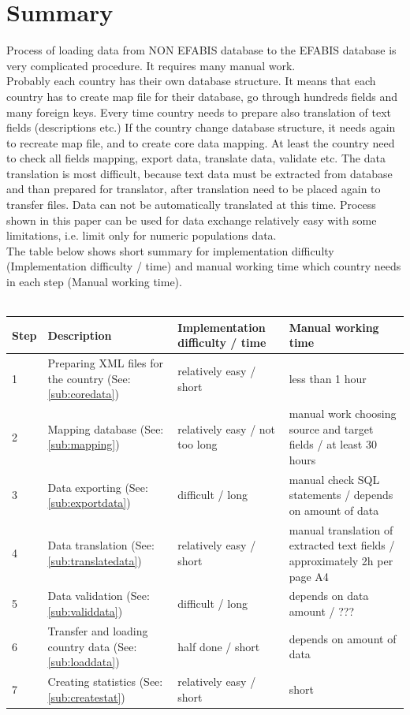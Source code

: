 \section{Summary}
Process of loading data from NON EFABIS database to the EFABIS database is very complicated procedure. It requires many manual work.\\
Probably each country has their own database structure. It means that each country has to create map file for their database, go through hundreds fields and many foreign keys. Every time country needs to prepare also translation of text fields (descriptions etc.) If the country change database structure, it needs again to recreate map file, and to create core data mapping. At least the country need to check all fields mapping, export data, translate data, validate etc. The data translation is most difficult, because text data must be extracted from database and than prepared for translator, after translation need to be placed again to transfer files. Data can not be automatically translated at this time. Process shown in this paper can be used for data exchange relatively easy with some limitations, i.e. limit only for numeric populations data.
 \\The table below shows short summary for implementation difficulty (Implementation difficulty / time) and manual working time which country needs in each step (Manual working time).\\ \\
\begin{tabular}{|p{}|p{}|p{3 cm}|p{}|}
\hline Step & Description &Implementation difficulty / time

& Manual working time \\ 
\hline  1 & Preparing XML files for the country (See: \ref{sub:coredata})& relatively easy / short    &  less than 1 hour\\ 
\hline  2 & Mapping database (See: \ref{sub:mapping}) & relatively easy / not too long & manual work choosing source and target fields / at least 30 hours \\ 
\hline  3 & Data exporting (See: \ref{sub:exportdata})& difficult / long & manual check SQL statements / depends on  amount of data \\ 
\hline  4 & Data translation (See: \ref{sub:translatedata})&  relatively easy / short & manual translation of extracted text fields / approximately 2h per page A4  \\ 
\hline	5 & Data validation (See: \ref{sub:validdata})& difficult / long& depends on data amount / ???\\
\hline  6 & Transfer and loading country data (See: \ref{sub:loaddata})	 & half done / short & depends on amount of data\\ 
\hline	7 & Creating statistics (See: \ref{sub:createstat})& relatively easy / short & short\\
\hline 
\end{tabular}


